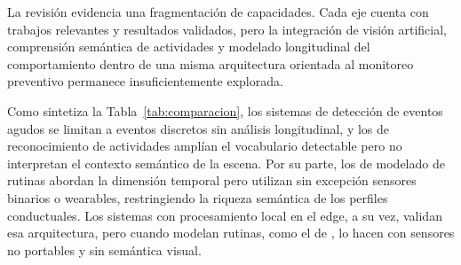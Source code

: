La revisión evidencia una fragmentación de capacidades.
Cada eje cuenta con trabajos relevantes y resultados validados, pero la integración de visión artificial, comprensión semántica de actividades y modelado longitudinal del comportamiento dentro de una misma arquitectura orientada al monitoreo preventivo permanece insuficientemente explorada.

Como sintetiza la Tabla~\ref{tab:comparacion}, los sistemas de detección de eventos agudos se limitan a eventos discretos sin análisis longitudinal, y los de reconocimiento de actividades amplían el vocabulario detectable pero no interpretan el contexto semántico de la escena.
Por su parte, los de modelado de rutinas abordan la dimensión temporal pero utilizan sin excepción sensores binarios o wearables, restringiendo la riqueza semántica de los perfiles conductuales.
Los sistemas con procesamiento local en el edge, a su vez, validan esa arquitectura, pero cuando modelan rutinas, como el de \textcite{Ali2025}, lo hacen con sensores no portables y sin semántica visual.

